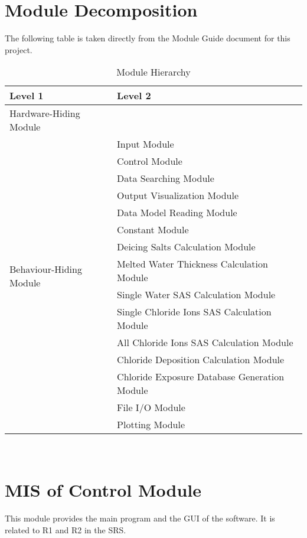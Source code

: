 \documentclass[12pt, titlepage]{article}
\begin{document}
\section{Module Decomposition}

The following table is taken directly from the Module Guide document for this project.
\begin{table}[h!]
\centering
\begin{tabular}{p{} p{}}
\toprule
\textbf{Level 1} & \textbf{Level 2}\\
\midrule

{Hardware-Hiding Module} & ~ \\
\midrule

\multirow{14}{0.3\textwidth}{Behaviour-Hiding Module} & Input Module\\
& Control Module\\
& Data Searching Module\\
& Output Visualization Module\\
& Data Model Reading Module \\
& Constant Module \\
& Deicing Salts Calculation Module \\
& Melted Water Thickness Calculation Module \\
& Single Water SAS Calculation Module \\
& Single Chloride Ions SAS Calculation Module \\
& All Chloride Ions SAS Calculation Module \\
& Chloride Deposition Calculation Module \\
& Chloride Exposure Database Generation Module\\
\midrule

\multirow{2}{0.3\textwidth}{Software Decision Module} &  File I/O Module \\
& Plotting Module \\
\bottomrule

\end{tabular}
\caption{Module Hierarchy}
\label{TblMH}
\end{table}
\newpage
~\newpage

\section{MIS of Control Module} \label{controlModule} 
This module provides the main program and the GUI of the software. It is related to R1 and R2 in the SRS.
\end{document}
